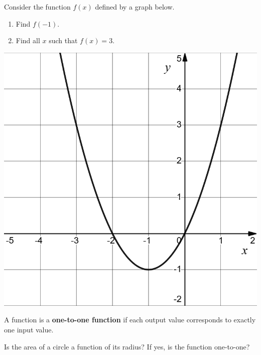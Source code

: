 \begin{example}
  Consider the function $f(x)$ defined by a graph below.

  \begin{multicols}{2}
    \begin{enumerate}
      \item Find $f(-1)$. 
      \item Find all $x$ such that $f(x)=3$.
    \end{enumerate}
    \vfill

    \columnbreak
    
    \begin{center}
      \includegraphics[scale=0.25]{figs/f(x)=x^2+2x.png}
    \end{center}
  \end{multicols}
\end{example}
\vspace*{-8\baselineskip}

\newpage

\begin{definition}
  A function is a \textbf{one-to-one function} if each output value corresponds to exactly one input value.
\end{definition}

\begin{example}
  Is the area of a circle a function of its radius? If yes, is the function one-to-one?
\end{example}



